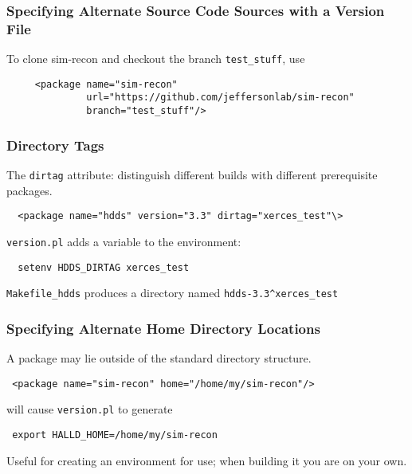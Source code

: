 \documentclass[xcolor=dvipsnames,hyperref={pdfpagelabels=false}]{beamer}
\begin{document}
\begin{frame}[fragile]
  \frametitle{Specifying Alternate Source Code Sources with a Version File}
To clone sim-recon and checkout the branch {\tt test\_stuff}, use
\begin{verbatim}
     <package name="sim-recon"
              url="https://github.com/jeffersonlab/sim-recon"
              branch="test_stuff"/>
\end{verbatim}

\end{frame}
\begin{frame}[fragile]
  \frametitle{Directory Tags}\label{section:directory-tags}

The {\tt dirtag} attribute: distinguish different builds with different prerequisite packages.
\begin{verbatim}
  <package name="hdds" version="3.3" dirtag="xerces_test"\>
\end{verbatim}
{\tt version.pl} adds a variable to the environment:
\begin{verbatim}
  setenv HDDS_DIRTAG xerces_test
\end{verbatim}
{\tt Makefile\_hdds} produces a directory named {\tt hdds-3.3\^{}xerces\_test}

\end{frame}
\begin{frame}
  \frametitle{Specifying Alternate Home Directory Locations}

A package may lie outside of the standard directory structure.
\begin{center} \tt
<package name="sim-recon" home="/home/my/sim-recon"/>
\end{center}
will cause {\tt version.pl} to generate
\begin{center} \tt
export HALLD\_HOME=/home/my/sim-recon
\end{center}
Useful for creating an environment for use; when building it you are on your own.

\end{frame}
\end{document}

